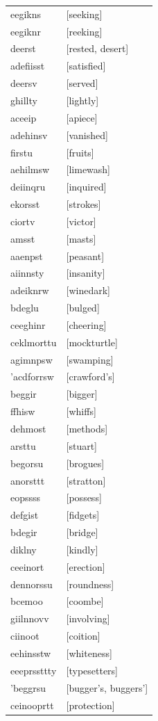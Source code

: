 \documentclass{article}
\begin{document}
\begin{tabular}{ll}
eegikns & [seeking] \\
eegiknr & [reeking] \\
deerst & [rested, desert] \\
adefiisst & [satisfied] \\
deersv & [served] \\
ghillty & [lightly] \\
aceeip & [apiece] \\
adehinsv & [vanished] \\
firstu & [fruits] \\
aehilmsw & [limewash] \\
deiinqru & [inquired] \\
ekorsst & [strokes] \\
ciortv & [victor] \\
amsst & [masts] \\
aaenpst & [peasant] \\
aiinnsty & [insanity] \\
adeiknrw & [winedark] \\
bdeglu & [bulged] \\
ceeghinr & [cheering] \\
ceklmorttu & [mockturtle] \\
agimnpsw & [swamping] \\
'acdforrsw & [crawford's] \\
beggir & [bigger] \\
ffhisw & [whiffs] \\
dehmost & [methods] \\
arsttu & [stuart] \\
begorsu & [brogues] \\
anorsttt & [stratton] \\
eopssss & [possess] \\
defgist & [fidgets] \\
bdegir & [bridge] \\
diklny & [kindly] \\
ceeinort & [erection] \\
dennorssu & [roundness] \\
bcemoo & [coombe] \\
giilnnovv & [involving] \\
ciinoot & [coition] \\
eehinsstw & [whiteness] \\
eeeprssttty & [typesetters] \\
'beggrsu & [bugger's, buggers'] \\
ceinooprtt & [protection] \\

\end{tabular}
\end{document}
